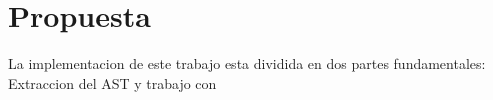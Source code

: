 \chapter{Propuesta}\label{chapter:proposal}

La implementacion  de este trabajo esta dividida en dos partes fundamentales: Extraccion del AST y trabajo con 